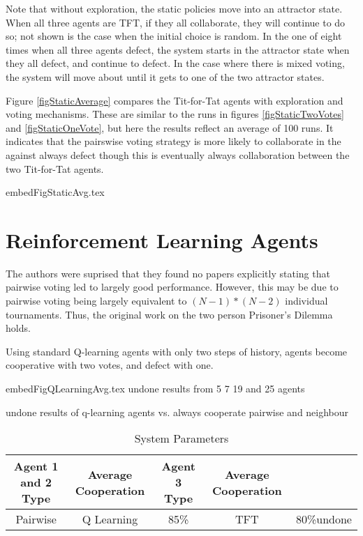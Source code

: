 \documentclass[]{llncs} %
\begin{document}
Note that without exploration, the static policies move into an attractor
state.  When all three agents are TFT, if they all collaborate, they
will continue to do so;  not shown is the case when the initial choice
is random.  In the one of eight times when all three agents defect, the
system starts in the attractor state when they all defect, and continue
to defect.  In the case where there is mixed voting, the system will move
about until it gets to one of the two attractor states.

Figure \ref {figStaticAverage} compares the Tit-for-Tat agents with
exploration and voting mechanisms.  These are similar to the runs in
figures \ref {figStaticTwoVotes} and \ref {figStaticOneVote}, but
here the results reflect an average of 100 runs.  It indicates that
the pairswise voting strategy is more likely to collaborate in the
against always defect though this is eventually always collaboration
between the two Tit-for-Tat agents.

 {embedFigStaticAvg.tex}

\section {Reinforcement Learning Agents}

The authors were suprised that they found no papers explicitly stating
that pairwise voting led to largely good performance.  However, this
may be due to pairwise voting being largely equivalent to
$(N-1)*(N-2)$ individual tournaments.  Thus, the original work on the
two person Prisoner's Dilemma holds.

Using standard Q-learning agents with only two steps of history,
agents become cooperative with two votes, and defect with one.

 {embedFigQLearningAvg.tex}
undone results from 5 7 19 and 25 agents

undone results of q-learning agents vs. always cooperate pairwise and
neighbour

\begin{table}
  \caption{System Parameters}
  \label{tableResults}
  
\begin {tabular}  {|c|c c|c c|}
\hline
Agent 1 and 2 Type & Average Cooperation & Agent 3 Type  & Average Cooperation \\
\hline
Pairwise &Q Learning& 85\%&TFT &80\%undone\\
\hline
\end {tabular}
\end{table}
\end{document}
